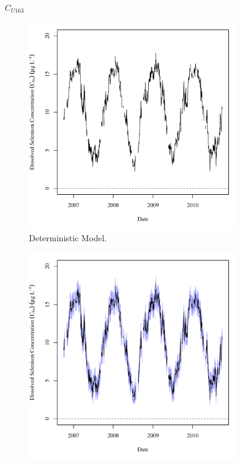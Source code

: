 \begin{linenumbers}
\subfiguretop
\begin{landscape}
	\begin{figure}
		$ C_{U163} $
		\begin{subfigure}{0.7\textwidth}
			\centering
			\includegraphics[width=\tableCustomSize]{"Figures/Results_USR/Deterministic/c TS U163"}
			\caption{Deterministic Model.}
		\end{subfigure}%
		\begin{subfigure}{0.7\textwidth}
			\centering
			\includegraphics[width=\tableCustomSize]{"Figures/Results_USR/Stochastic/c TS U163"}

\end{subfigure}
\end{figure}
\end{landscape}
\end{linenumbers}
